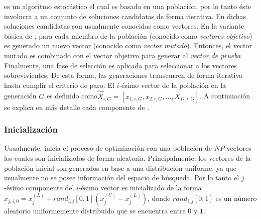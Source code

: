 \DE{} es un algoritmo estocástico el cual es basado en una población, por lo tanto éste involucra a un conjunto de soluciones candidatas de forma iterativa.
%
En \DE{} dichas soluciones candidatas son usualmente conocidas como vectores.
%
En la variante básica de \DE{}, para cada miembro de la población (conocido como \textit{vectores objetivo}) es generado un nuevo vector (conocido como \textit{vector mutado}).
%
Entonces, el vector mutado es combinado con el vector objetivo para generar al \textit{vector de prueba}.
%
Finalmente, una fase de selección es aplicada para seleccionar a los vectores sobrevivientes.
%
De esta forma, las generaciones transcurren de forma iterativa hasta cumplir el criterio de paro.
%
El $i$-ésimo vector de la población en la generación $G$ es definido como$\vec{X}_{i,G} = [x_{1,i,G}, x_{2,i,G},..., X_{D,i, G}]$.
%
A continuación se explica en más detalle cada componente de \DE{}.


\subsubsection{Inicialización}

Usualmente, \DE{} inicia el proceso de optimización con una población de $NP$ vectores los cuales son inicializados de forma aleatoria.
%
Principalmente, los vectores de la población inicial son generados en base a una distribución uniforme, ya que usualmente no se posee información del espacio de búsqueda.
%
Por lo tanto el $j$-ésimo componente del $i$-ésimo vector es inicializado de la forma $x_{j,i,0} = x_{j}^{(L)} + rand_{i,j}[0,1] (x_{j}^{(U)} - x_{j}^{(L)})$,
donde $rand_{i,j}[0,1]$ es un número aleatorio uniformemente distribuido que se encuentra entre $0$ y $1$.


